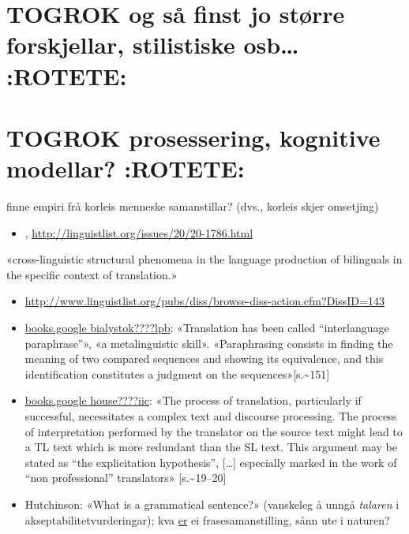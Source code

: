 \documentclass[11pt,a4paper,oneside,draft]{book}
\begin{document}
 
\section{\textbf{TOGROK} og så finst jo større forskjellar, stilistiske osb\ldots{} \textbf{:ROTETE:}}
\label{sec-3.19}


\section{\textbf{TOGROK} prosessering, kognitive modellar? \textbf{:ROTETE:}}
\label{sec-3.20}

finne empiri frå korleis menneske samanstillar? (dvs., korleis skjer
omsetjing)

\begin{itemize}
\item \citet{maier2009sis}, \href{http://linguistlist.org/issues/20/20-1786.html}{http://linguistlist.org/issues/20/20-1786.html}
\end{itemize}
«cross-linguistic structural phenomena in the language production of
bilinguals in the specific context of translation.»

\begin{itemize}
\item \href{http://www.linguistlist.org/pubs/diss/browse-diss-action.cfm?DissID=143}{http://www.linguistlist.org/pubs/diss/browse-diss-action.cfm?DissID=143}
\item \href{http://books.google.com/books%3Fhl%3Dno&lr%3D&ie%3DUTF-8&id%3DhHFoJguRE4oC&oi%3Dfnd&pg%3DPA141&dq%3Dprocessing%2Btranslation%2Bpsycholinguistic%2Bsyntax&ots%3DNUlz1ebVnE&sig%3DrkMwuX59RoIikvTYGq23HNkYtzc}{books.google bialystok????lpb}: «Translation has been called
  ``interlanguage paraphrase''», «a metalinguistic skill». «Paraphrasing
  consists in finding the meaning of two compared sequences and
  showing its equivalence, and this identification constitutes a
  judgment on the sequences»[s.\~{}151]
\item \href{http://books.google.com/books%3Fhl%3Dno&lr%3D&ie%3DUTF-8&id%3DCZXcTzFLDuwC&oi%3Dfnd&pg%3DPA17&dq%3Dprocessing%2Btranslation%2Bpsycholinguistic%2Bsyntax&ots%3DFUm_X5VCeu&sig%3DNoHLNrNxq7bGNAcsRda8RWNDyOY}{books.google house????iic}: «The process of translation, particularly
  if successful, necessitates a complex text and discourse
  processing. The process of interpretation performed by the
  translator on the source text might lead to a TL text which is more
  redundant than the SL text. This argument may be stated as ``the
  explicitation hypothesis'', [\ldots{}] especially marked in the work of
  ``non professional'' translators» [s.\~{}19--20]
\item Hutchinson: «What is a grammatical sentence?» (vanskeleg å unngå
  \emph{talaren} i akseptabilitetvurderingar); kva \underline{er} ei frasesamanstilling,
  sånn ute i naturen?
\end{itemize}
\end{document}
